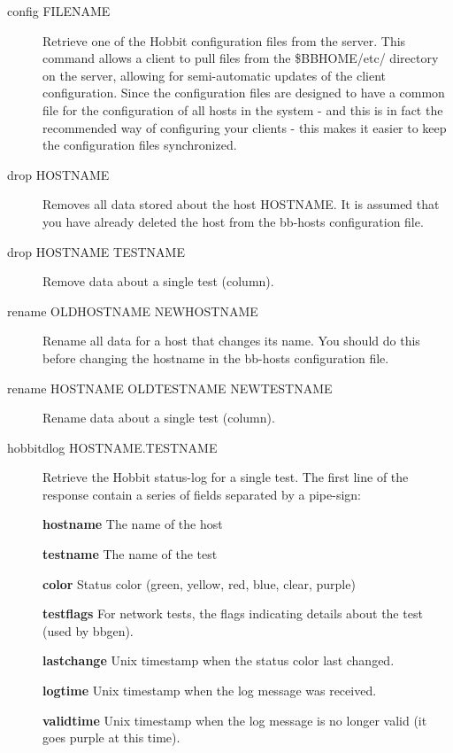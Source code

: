 \begin{description}
 

\item[config FILENAME] Retrieve one of the Hobbit configuration files
  from the server. This command allows a client to pull files from the
  \$BBHOME/etc/ directory on the server, allowing for semi-automatic
  updates of the client configuration. Since the configuration files
  are designed to have a common file for the configuration of all
  hosts in the system - and this is in fact the recommended way of
  configuring your clients - this makes it easier to keep the
  configuration files synchronized. 


 

\item[drop HOSTNAME] Removes all data stored about the host
  HOSTNAME. It is assumed that you have already deleted the host from
  the bb-hosts configuration file. 


 

\item[drop HOSTNAME TESTNAME] Remove data about a single test (column). 

 

\item[rename OLDHOSTNAME NEWHOSTNAME] Rename all data for a host that
  changes its name. You should do this before changing the hostname in
  the bb-hosts configuration file. 


 

\item[rename HOSTNAME OLDTESTNAME NEWTESTNAME] Rename data about a single test (column). 

 

\item[hobbitdlog HOSTNAME.TESTNAME] Retrieve the Hobbit status-log for
  a single test. The first line of the response contain a series of
  fields separated by a pipe-sign: 


 \textbf{hostname}
 The name of the host 


 \textbf{testname}
 The name of the test 


 \textbf{color}
 Status color (green, yellow, red, blue, clear, purple) 


 \textbf{testflags}
 For network tests, the flags indicating details about the test (used by bbgen). 


 \textbf{lastchange}
 Unix timestamp when the status color last changed. 


 \textbf{logtime}
 Unix timestamp when the log message was received. 


 \textbf{validtime}
 Unix timestamp when the log message is no longer valid (it goes purple at this time). 



\end{description}
